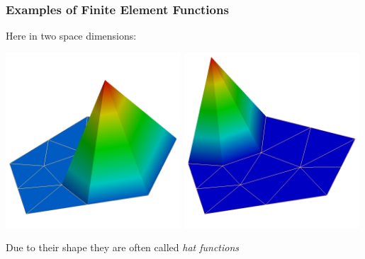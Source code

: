 \documentclass[ignorenonframetext,11pt]{beamer}
\theoremstyle{definition}
\begin{document}
\begin{frame}
\frametitle{Examples of Finite Element Functions}
Here in two space dimensions:
\begin{center}
\includegraphics[width=0.49\textwidth]{p1_1}
\includegraphics[width=0.49\textwidth]{p1_2}
\end{center}
Due to their shape they are often called {\em hat functions}
\end{frame}
\end{document}
